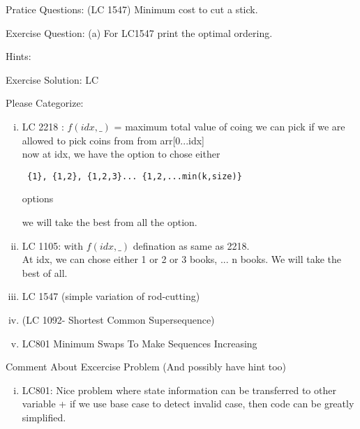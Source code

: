 







\vspace{3cm}



Pratice Questions:
(LC 1547) Minimum cost to cut a stick.

Exercise Question:
(a) For LC1547 print the optimal ordering.

Hints: \label{hints}
\unvbox\hints


Exercise Solution:
LC

Please Categorize:
\begin{enumerate}[(i)]
    \item 
     LC 2218 : $f(idx,\_)$ = maximum total value of coing we can pick if we are allowed to pick coins from from arr[0...idx]\\
     now at idx, we have the option to chose either \begin{verbatim} {1}, {1,2}, {1,2,3}... {1,2,...min(k,size)} \end{verbatim} options
        
     we will take the best from all the option.
    
     \item LC 1105: with $f(idx,\_)$ defination as same as 2218.\\
     At idx, we can chose either 1 or 2 or 3 books, ... n books. We will take the best of all.

     \item LC 1547 (simple variation of rod-cutting)
     \item (LC 1092- Shortest Common Supersequence)
     \item LC801 Minimum Swaps To Make Sequences Increasing 
\end{enumerate}

\vspace{5cm}
Comment About Excercise Problem (And possibly have hint too)
\begin{enumerate}[(i)]
    \item LC801: Nice problem where state information can be transferred to other variable + if we use base case to detect invalid case, then code can be greatly simplified.
\end{enumerate}
